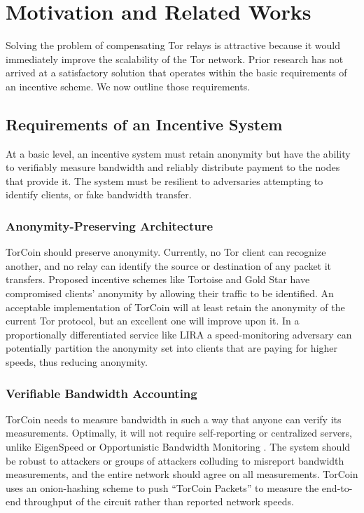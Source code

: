 \section{Motivation and Related Works} \label{motivation} Solving the problem of compensating
Tor relays is attractive because it would immediately improve the scalability
of the Tor network. Prior research has not arrived at a satisfactory solution
that operates within the basic requirements of an incentive scheme. We now
outline those requirements.

\subsection{Requirements of an Incentive System} At a basic level, an
incentive system must retain anonymity but have the ability to verifiably
measure bandwidth and reliably distribute payment to the nodes that provide
it. The system must be resilient to adversaries attempting to  identify
clients, or fake bandwidth transfer.

\subsubsection{Anonymity-Preserving Architecture} TorCoin should preserve
anonymity. Currently, no Tor client can recognize another, and no relay can
identify the source or destination of any packet it transfers. Proposed
incentive schemes like Tortoise\cite{acsac11-tortoise} and Gold Star\cite
{incentives-fc10} have compromised clients' anonymity by allowing their
traffic to be identified\cite{jansen2013lira}. An acceptable implementation of
TorCoin will at least retain the anonymity of the current Tor protocol, but
an excellent one will improve upon it. In a proportionally differentiated
service \cite{blake1998architecture, dovrolis1999case} like LIRA
\cite{jansen2013lira} a speed-monitoring adversary can potentially partition
the anonymity set into clients that are paying for higher speeds, thus
reducing anonymity.

\subsubsection{Verifiable Bandwidth Accounting} TorCoin needs to measure
bandwidth in such a way that anyone can verify its measurements. Optimally, it
will not require self-reporting or centralized servers, unlike EigenSpeed
\cite{snader2009eigenspeed} or Opportunistic Bandwidth Monitoring
\cite{snader2008tune}. The system should be robust to attackers or groups of
attackers colluding to misreport bandwidth measurements, and the entire
network  should agree on all measurements. TorCoin uses an onion-hashing
scheme to push  ``TorCoin Packets'' to measure the end-to-end throughput of
the circuit rather  than reported network speeds.

